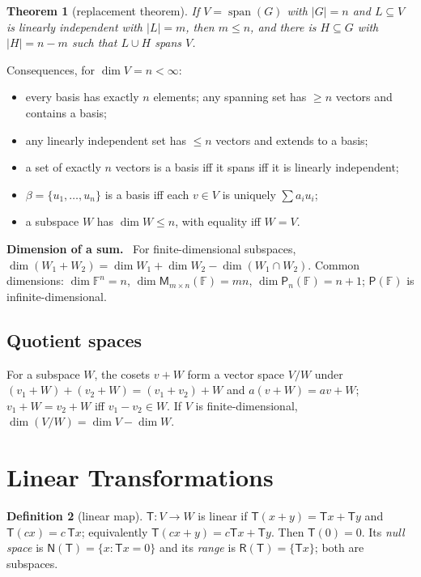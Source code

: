 \documentclass[12pt]{article}
\newtheorem{theorem}{Theorem}[section]
\theoremstyle{definition}
\newtheorem{definition}[theorem]{Definition}
\theoremstyle{remark}
\newenvironment{fact}[1]{\par\noindent\textbf{#1.}\ }{\par}
\newcommand{\F}{\mathbb{F}}
\newcommand{\N}{\mathsf{N}}
\newcommand{\Rg}{\mathsf{R}}
\newcommand{\M}{\mathsf{M}}
\newcommand{\Poly}{\mathsf{P}}
\newcommand{\T}{\mathsf{T}}
\DeclareMathOperator{\spn}{span}
\begin{document}
\begin{theorem}[replacement theorem]
If $V=\spn(G)$ with $|G|=n$ and $L\subseteq V$ is linearly independent with $|L|=m$, then $m\le n$, and there is
$H\subseteq G$ with $|H|=n-m$ such that $L\cup H$ spans $V$.
\end{theorem}

Consequences, for $\dim V=n<\infty$:
\begin{itemize}
  \item every basis has exactly $n$ elements; any spanning set has $\ge n$ vectors and contains a basis;
  \item any linearly independent set has $\le n$ vectors and extends to a basis;
  \item a set of exactly $n$ vectors is a basis iff it spans iff it is linearly independent;
  \item $\beta=\{u_1,\dots,u_n\}$ is a basis iff each $v\in V$ is uniquely $\sum a_iu_i$;
  \item a subspace $W$ has $\dim W\le n$, with equality iff $W=V$.
\end{itemize}

\begin{fact}{Dimension of a sum}
For finite-dimensional subspaces, $\dim(W_1+W_2)=\dim W_1+\dim W_2-\dim(W_1\cap W_2)$.
Common dimensions: $\dim\F^n=n$, $\dim\M_{m\times n}(\F)=mn$, $\dim\Poly_n(\F)=n+1$; $\Poly(\F)$ is infinite-dimensional.
\end{fact}

\subsection{Quotient spaces}
For a subspace $W$, the cosets $v+W$ form a vector space $V/W$ under $(v_1+W)+(v_2+W)=(v_1+v_2)+W$ and $a(v+W)=av+W$;
$v_1+W=v_2+W$ iff $v_1-v_2\in W$. If $V$ is finite-dimensional, $\dim(V/W)=\dim V-\dim W$.

\section{Linear Transformations}

\begin{definition}[linear map]
$\T\colon V\to W$ is linear if $\T(x+y)=\T x+\T y$ and $\T(cx)=c\,\T x$; equivalently $\T(cx+y)=c\T x+\T y$.
Then $\T(0)=0$. Its \emph{null space} is $\N(\T)=\{x:\T x=0\}$ and its \emph{range} is $\Rg(\T)=\{\T x\}$; both are subspaces.
\end{definition}
\end{document}

